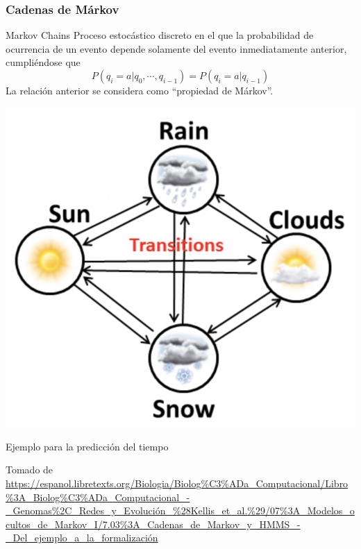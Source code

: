 \documentclass[
10pt, %
aspectratio=169, %
]{beamer}
\begin{document}
	\begin{frame}
		
		\frametitle{Cadenas de Márkov} 
		
		\begin{block}{Markov Chains}
			Proceso estocástico discreto en el que la probabilidad de ocurrencia de un evento depende solamente del evento inmediatamente anterior, cumpliéndose que 
			$$P(q_i = a | q_0, \cdots, q_{i-1}) = P(q_i = a | q_{i-1})$$
			La relación anterior se considera como ``propiedad de Márkov''.
		\end{block}
		
		\pause 
		\noindent\begin{minipage}{.4\textwidth}
			\centering	
			\includegraphics[scale=0.38]{cadena_markov.png} 
		\end{minipage}%
		\begin{minipage}{.6\textwidth}
			\vspace{2\baselineskip}
			
			Ejemplo para la predicción del tiempo 
			
			{\scriptsize Tomado de \url{https://espanol.libretexts.org/Biologia/Biolog\%C3\%ADa\_Computacional/Libro\%3A\_Biolog\%C3\%ADa\_Computacional\_-\_Genomas\%2C\_Redes\_y\_Evolución\_\%28Kellis\_et\_al.\%29/07\%3A\_Modelos\_ocultos\_de\_Markov\_I/7.03\%3A\_Cadenas\_de\_Markov\_y\_HMMS\_-\_Del\_ejemplo\_a\_la\_formalización}}
		\end{minipage}
		
	\end{frame}
	
\end{document}
